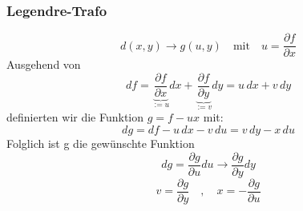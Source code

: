 \documentclass[titlepage,12pt,a4paper,ngerman]{report}
\newcommand{\tx}[1]{\textrm{#1}}
\newcommand{\ub}[1]{\underbrace{#1}}
\begin{document}
{\subsubsection{Legendre-Trafo}
\begin{equation*}
d(x,y) \rightarrow g(u,y) \quad \tx{mit} \quad u = \frac{\partial f}{\partial x} \tag{2}
\end{equation*}
Ausgehend von
\begin{equation*}
df = \ub{\frac{\partial f}{\partial x}}_{:= u} dx + \ub{\frac{\partial f}{\partial y}}_{:= v} dy = u \, dx + v \, dy
\end{equation*}
definierten wir die Funktion $ g = f - ux $ mit:
\begin{equation*}
dg = df - u\, dx  - v\, du = v \, dy - x \, du \tag{3}
\end{equation*}
Folglich ist g die gewünschte Funktion
\begin{equation*}
dg = \frac{\partial g}{\partial u} du \rightarrow \frac{\partial g}{\partial y} dy \tag{4}
\end{equation*}
\begin{equation*}
v = \frac{\partial g}{\partial y} \quad , \quad x = -\frac{\partial g}{\partial u}
\end{equation*}


}
\end{document}
